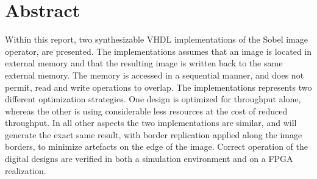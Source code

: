 \chapter*{Abstract}
Within this  report, two synthesizable VHDL implementations of the Sobel image operator, are presented. The implementations assumes that an image is located in external memory and that the resulting image is written back to the same external memory.
The memory is accessed in a sequential manner, and does not permit, read and write operations to overlap.
The implementations represents two different optimization strategies. One design is optimized for throughput alone, whereas the other is using considerable less resources at the cost of reduced throughput.
In all other aspects the two implementations are similar, and will generate the exact same result, with border replication applied along the image borders, to minimize artefacts on the edge of the image.
Correct operation of the digital designs are verified in both a simulation environment and on a FPGA realization.
